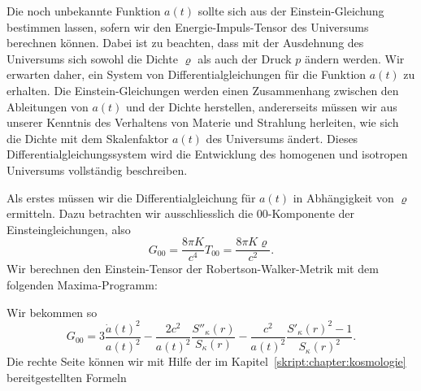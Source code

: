 Die noch unbekannte Funktion $a(t)$ sollte sich aus der
Einstein-Gleichung bestimmen lassen, sofern wir den Energie-Impuls-Tensor
des Universums berechnen können.
Dabei ist zu beachten, dass mit der Ausdehnung des Universums sich sowohl
die Dichte $\varrho$ als auch der Druck $p$ ändern werden.
Wir erwarten daher, ein System von Differentialgleichungen
für die Funktion $a(t)$ zu erhalten.
Die Einstein-Gleichungen werden einen Zusammenhang zwischen den 
Ableitungen von $a(t)$ und der Dichte herstellen,
andererseits müssen wir aus unserer Kenntnis des Verhaltens von
Materie und Strahlung herleiten, wie sich die Dichte mit dem
Skalenfaktor  $a(t)$ des Universums ändert.
Dieses Differentialgleichungssystem wird die Entwicklung des homogenen
und isotropen Universums vollständig beschreiben.

Als erstes müssen wir die Differentialgleichung für $a(t)$
in Abhängigkeit von $\varrho$ ermitteln.
Dazu betrachten wir ausschliesslich die $00$-Komponente der
Einsteingleichungen, also
\begin{equation}
G_{00} = \frac{8\pi K}{c^4} T_{00}=\frac{8\pi K\varrho}{c^2}.
\label{skript:friedmann:einstein}
\end{equation}
Wir berechnen den Einstein-Tensor der Robertson-Walker-Metrik
mit dem folgenden Maxima-Pro\-gramm:

Wir bekommen so
\begin{equation}
G_{00}
=
3\frac{\dot a(t)^2}{a(t)^2}
-\frac{2c^2}{a(t)^2}\frac{S''_\kappa(r)}{S_\kappa(r)}
-\frac{c^2}{a(t)^2}
\frac{S'_\kappa(r)^2-1}{S_\kappa(r)^2}.
\end{equation}
Die rechte Seite können wir mit Hilfe der im
Kapitel~\ref{skript:chapter:kosmologie} bereitgestellten Formeln

